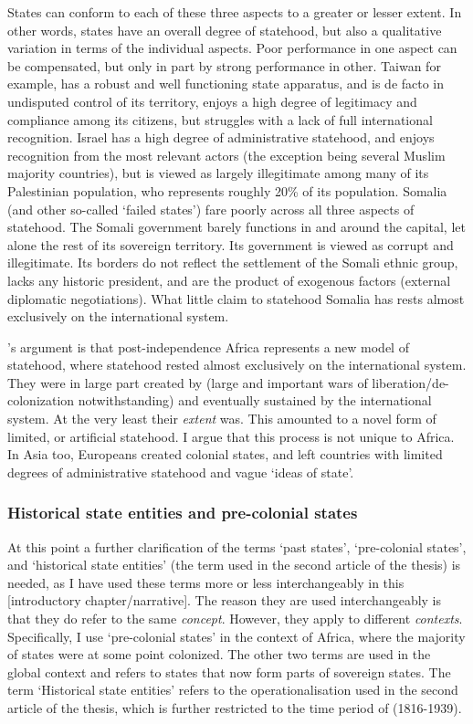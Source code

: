 States can conform to each of these three aspects to a greater or lesser extent.
In other words, states have an overall degree of statehood, but also a
qualitative variation in terms of the individual aspects. Poor performance in
one aspect can be compensated, but only in part by strong performance in other.
Taiwan for example, has a robust and well functioning state apparatus, and is de
facto in undisputed control of its territory, enjoys a high degree of legitimacy
and compliance among its citizens, but struggles with a lack of full
international recognition. Israel has a high degree of administrative statehood, and
enjoys recognition from the most relevant actors (the exception being several
Muslim majority countries), but is viewed as largely illegitimate among many of
its Palestinian population, who represents roughly 20\% of its population.
Somalia (and other so-called `failed states') fare poorly across all three
aspects of statehood. The Somali government barely functions in and around the
capital, let alone the rest of its sovereign territory. Its government is
viewed as corrupt and illegitimate. Its borders do not reflect the settlement of
the Somali ethnic group, lacks any historic president, and are the product of
exogenous factors (external diplomatic negotiations). What little claim to
statehood Somalia has rests almost exclusively on the international system.

\citet{Clapham1996}'s argument is that post-independence Africa represents a new
model of statehood, where statehood rested almost exclusively on the
international system. They were in large part created by (large and important
wars of liberation/de-colonization notwithstanding) and eventually sustained by
the international system. At the very least their \textit{extent} was. This
amounted to a novel form of limited, or artificial statehood. I argue that this
process is not unique to Africa. In Asia too, Europeans created colonial states,
and left countries with limited degrees of administrative statehood and vague
`ideas of state'.

\subsubsection{Historical state entities and pre-colonial states} 
\label{Historical state entities and Pre-colonial states}

At this point a further clarification of the terms `past states', `pre-colonial
states', and `historical state entities' (the term used in the second article of
the thesis) is needed, as I have used these terms more or less interchangeably
in this [introductory chapter/narrative]. The reason they are used
interchangeably is that they do refer to the same \textit{concept}. However,
they apply to different \textit{contexts}. Specifically, I use `pre-colonial
states' in the context of Africa, where the majority of states were at some
point colonized. The other two terms are used in the global context and refers
to states that now form parts of sovereign states. The term `Historical state
entities' refers to the operationalisation used in the second article of the
thesis, which is further restricted to the time period of (1816-1939).

